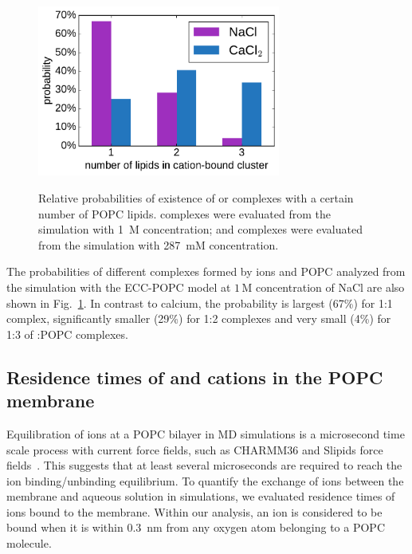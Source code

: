 \begin{figure}[tb!] 
  \centering 
  \includegraphics[width=8.0cm]{../img/ecc_popc/stoichiometry_NaCl-CaCl2_comparison_Ecc-lipids.pdf} \\ 
  \caption{\label{fig:cacl_complexes} 
      Relative probabilities of existence of  or  complexes 
      with a certain number of POPC lipids.  
       complexes were evaluated from the simulation with 1~M concentration; 
      and  complexes were evaluated from the simulation with 287~mM concentration. 
  } 
\end{figure} 
 
The probabilities of different complexes formed by  ions and POPC 
analyzed from the simulation with the ECC-POPC model at $1\,$M concentration of NaCl are also  
shown in Fig.~\ref{fig:cacl_complexes}. In contrast to calcium, the 
probability is largest (67\%) for 1:1 complex, significantly smaller (29\%) 
for 1:2 complexes and very small (4\%) for 1:3 of :POPC complexes. 
 
 
 
 
\subsection{Residence times of  and  cations in the POPC membrane} 
 
Equilibration of  ions at a POPC bilayer in MD simulations is a microsecond time scale process with current force fields, such  as CHARMM36 and Slipids force fields~\citep{javanainen17}. This suggests that at least several microseconds are required to reach the ion binding/unbinding equilibrium. 
To quantify the exchange of ions between the membrane and aqueous solution in simulations, we evaluated residence times of ions bound to the membrane. Within our analysis, an ion is considered to be bound when it is within 0.3~nm from any oxygen atom belonging to a POPC molecule. 
 
